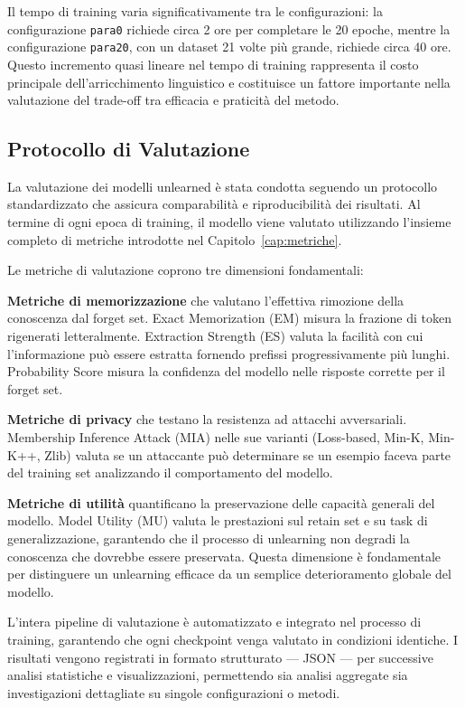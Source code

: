 Il tempo di training varia significativamente tra le configurazioni: la configurazione \texttt{para0} richiede circa 2 ore per completare le 20 epoche, mentre la configurazione \texttt{para20}, con un dataset 21 volte più grande, richiede circa 40 ore. Questo incremento quasi lineare nel tempo di training rappresenta il costo principale dell'arricchimento linguistico e costituisce un fattore importante nella valutazione del trade-off tra efficacia e praticità del metodo.

\subsection{Protocollo di Valutazione}

La valutazione dei modelli unlearned è stata condotta seguendo un protocollo standardizzato che assicura comparabilità e riproducibilità dei risultati. Al termine di ogni epoca di training, il modello viene valutato utilizzando l'insieme completo di metriche introdotte nel Capitolo~\ref{cap:metriche}.

Le metriche di valutazione coprono tre dimensioni fondamentali:

\textbf{Metriche di memorizzazione} che valutano l'effettiva rimozione della conoscenza dal forget set. Exact Memorization (EM) misura la frazione di token rigenerati letteralmente. Extraction Strength (ES) valuta la facilità con cui l'informazione può essere estratta fornendo prefissi progressivamente più lunghi. Probability Score misura la confidenza del modello nelle risposte corrette per il forget set.

\textbf{Metriche di privacy} che testano la resistenza ad attacchi avversariali. Membership Inference Attack (MIA) nelle sue varianti (Loss-based, Min-K, Min-K++, Zlib) valuta se un attaccante può determinare se un esempio faceva parte del training set analizzando il comportamento del modello.

\textbf{Metriche di utilità} quantificano la preservazione delle capacità generali del modello. Model Utility (MU) valuta le prestazioni sul retain set e su task di generalizzazione, garantendo che il processo di unlearning non degradi la conoscenza che dovrebbe essere preservata. Questa dimensione è fondamentale per distinguere un unlearning efficace da un semplice deterioramento globale del modello.

L'intera pipeline di valutazione è automatizzato e integrato nel processo di training, garantendo che ogni checkpoint venga valutato in condizioni identiche. I risultati vengono registrati in formato strutturato --- JSON --- per successive analisi statistiche e visualizzazioni, permettendo sia analisi aggregate sia investigazioni dettagliate su singole configurazioni o metodi.

